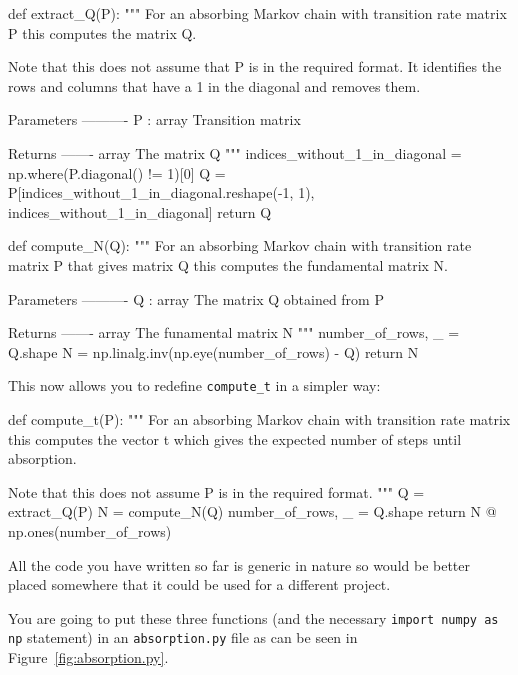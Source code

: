 \begin{python}
def extract_Q(P):
    """
    For an absorbing Markov chain with transition rate matrix P this computes the
    matrix Q.

    Note that this does not assume that P is in the required format. It
    identifies the rows and columns that have a 1 in the diagonal and removes
    them.

    Parameters
    ----------
    P : array
        Transition matrix

    Returns
    -------
    array
        The matrix Q
    """
    indices_without_1_in_diagonal = np.where(P.diagonal() != 1)[0]
    Q = P[indices_without_1_in_diagonal.reshape(-1, 1), indices_without_1_in_diagonal]
    return Q


def compute_N(Q):
    """
    For an absorbing Markov chain with transition rate matrix P that gives
    matrix Q this computes the fundamental matrix N.

    Parameters
    ----------
    Q : array
        The matrix Q obtained from P

    Returns
    -------
    array
        The funamental matrix N
    """
    number_of_rows, _ = Q.shape
    N = np.linalg.inv(np.eye(number_of_rows) - Q)
    return N
\end{python}





This now allows you to redefine \texttt{compute\_t} in a simpler way:




\begin{python}
def compute_t(P):
    """
    For an absorbing Markov chain with transition rate matrix this computes the
    vector t which gives the expected number of steps until absorption.

    Note that this does not assume P is in the required format.
    """
    Q = extract_Q(P)
    N = compute_N(Q)
    number_of_rows, _ = Q.shape
    return N @ np.ones(number_of_rows)
\end{python}


\begin{note}
All the code you have written so far is generic in nature so would be better
placed somewhere that it could be used for a different project.
\end{note}



You are going to put these three functions (and the necessary \texttt{import
numpy as np} statement) in an \texttt{absorption.py} file as can be seen in
Figure~\ref{fig:absorption.py}.

